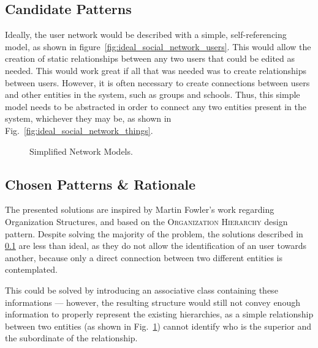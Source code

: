 \subsection{Candidate Patterns}\label{sec:fa_social_network_candidate_patterns}

Ideally, the user network would be described with a simple, self-referencing model, as shown in figure~\ref{fig:ideal_social_network_users}. This would allow the creation of static relationships between any two users that could be edited as needed. This would work great if all that was needed was to create relationships between users. However, it is often necessary to create connections between users and other entities in the system, such as groups and schools. Thus, this simple model needs to be abstracted in order to connect any two entities present in the system, whichever they may be, as shown in Fig.~\ref{fig:ideal_social_network_things}.

\begin{figure}[H]
  \centering
  \hspace{20mm}
  \caption{Simplified Network Models.}
  \label{fig:simplified_network_models}
\end{figure}

\subsection{Chosen Patterns \& Rationale}\label{sec:fa_social_network_chosen_patterns_rationale}

The presented solutions are inspired by Martin Fowler's work regarding Organization Structures, and based on the \textsc{Organization Hierarchy} design pattern. Despite solving the majority of the problem, the solutions described in \ref{sec:fa_social_network_candidate_patterns} are less than ideal, as they do not allow the identification of an user towards another, because only a direct connection between two different entities is contemplated.

This could be solved by introducing an associative class containing these informations --- however, the resulting structure would still not convey enough information to properly represent the existing hierarchies, as a simple relationship between two entities (as shown in Fig.~\ref{fig:simplified_network_models}) cannot identify who is the superior and the subordinate of the relationship.

